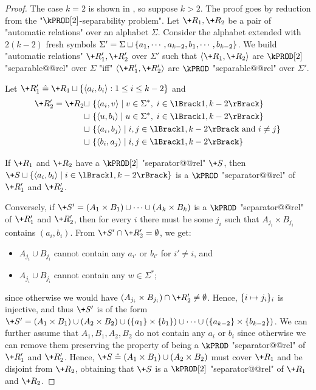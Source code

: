 \begin{proof}
    The case $k=2$ is shown in , so suppose $k>2$.
    The proof goes by reduction from the "$\kPROD[2]$-separability problem". Let $\+R_1,\+R_2$ be a pair of "automatic relations" over an alphabet $\Sigma$. Consider the alphabet extended with $2(k-2)$ fresh symbols $\Sigma' = \Sigma \sqcup \{a_1, \cdots, a_{k-2}, b_1, \cdots, b_{k-2}\}$. We build "automatic relations" $\+R'_1,\+R'_2$ over $\Sigma'$ such that $\tup{\+R_1, \+R_2}$ are $\kPROD[2]$ "separable@@rel" over $\Sigma$ "iff" $\tup{\+R'_1, \+R'_2}$ are $\kPROD$ "separable@@rel" over $\Sigma'$.

    Let $\+R'_1 \defeq \+R_1 \dcup \set{\tup{a_i,b_i} : 1 \leq i \leq k-2}$ and 
    \begin{align*}
    \+R'_2 =  \+R_2 \dcup~&\set{\tup{a_i,v} \mid v \in \Sigma^*,\; i \in \lBrack 1,k-2\rBrack} \\
    \dcup~&\set{\tup{u,b_i} \mid u \in \Sigma^*,\; i \in \lBrack 1,k-2\rBrack}\\
    \dcup~&\set{\tup{a_i,b_j} \mid i,j \in \lBrack 1,k-2\rBrack \text{ and } i \neq j}\\
    \dcup~&\set{\tup{b_i,a_j} \mid i,j \in \lBrack 1,k-2\rBrack}
    \end{align*}
    
    If $\+R_1$ and $\+R_2$ have a $\kPROD[2]$ "separator@@rel" $\+S$, then $\+S \dcup \set{\tup{a_i,b_i} \mid i \in \lBrack 1,k-2\rBrack}$ is a $\kPROD$ "separator@@rel" of $\+R'_1$ and $\+R'_2$.
    

    Conversely, if $\+S' = (A_1 \times B_1) \cup \dotsb \cup (A_k \times B_k)$ is a $\kPROD$ "separator@@rel" of $\+R'_1$ and $\+R'_2$, then for every $i$ there must be some $j_i$ such that $A_{j_i} \times B_{j_i}$ contains $(a_i,b_i)$. From $\+S' \cap \+R'_2 = \emptyset$, we get:
    \begin{itemize}
        \item $A_{j_i} \cup B_{j_i}$ cannot contain any $a_{i'}$ or $b_{i'}$ for $i' \neq i$, and
        \item $A_{j_i} \cup B_{j_i}$ cannot contain any $w \in \Sigma^*$;
    \end{itemize}
    since otherwise we would have $(A_{j_i} \times B_{j_i}) \cap \+R'_2 \neq \emptyset$.
    Hence, $\{i \mapsto j_i\}_i$ is injective, and thus $\+S'$ is of the form $\+S' = (A_1 \times B_1) \cup (A_2 \times B_2)  \cup (\set{a_1} \times \set{b_1}) \cup \dotsb \cup (\set{a_{k-2}} \times \set{b_{k-2}})$. We can further assume that $A_1,B_1,A_2,B_2$ do not contain any $a_i$ or $b_i$ since otherwise we can remove them preserving the property of being a $\kPROD$ "separator@@rel" of $\+R'_1$ and $\+R'_2$.
    Hence, $\+S \defeq (A_1 \times B_1) \cup (A_2 \times B_2)$ must cover $\+R_1$ and be disjoint from $\+R_2$, obtaining that $\+S$ is a $\kPROD[2]$ "separator@@rel" of $\+R_1$ and $\+R_2$.
\end{proof}


